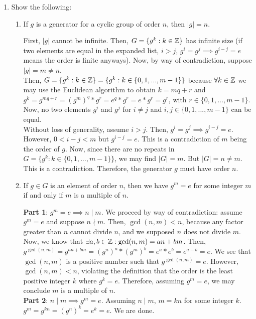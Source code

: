 \documentclass{amsart}
\begin{document}
\begin{enumerate}[itemsep=0.4in]
\item Show the following:
\begin{enumerate}
	\item If $g$ is a generator for a cyclic group of order $n$, then $|g| = n$.

        First, $|g|$ cannot be infinite. Then, $G=\{g^k:k\in\mathbb{Z}\}$ has infinite size (if two elements are equal in the expanded list, $i>j$, $g^i=g^j\implies g^{i-j}=e$ means the order is finite anyways). Now, by way of contradiction, suppose $|g|=m\neq n$.\\

        Then, $G=\{g^k:k\in\mathbb{Z}\}=\{g^k:k\in\{0,1,...,m-1\}\}$ because $\forall k\in\mathbb{Z}$ we may use the Euclidean algorithm to obtain $k=mq+r$ and $g^k=g^{mq+r}=(g^m)^q*g^r=e^q*g^r=e*g^r=g^r$, with $r\in\{0,1,...,m-1\}$. Now, no two elements $g^i$ and $g^j$ for $i\neq j$ and $i,j\in\{0,1,...,m-1\}$ can be equal.\\
        
        Without loss of generality, assume $i>j$. Then, $g^i=g^j\implies g^{i-j}=e$. However, $0<i-j<m$ but $g^{i-j}=e$. This is a contradiction of $m$ being the order of $g$. Now, since there are no repeats in $G=\{g^k:k\in\{0,1,...,m-1\}\}$, we may find $|G|=m$. But $|G|=n\neq m$. This is a contradiction. Therefore, the generator $g$ must have order $n$.
        
    
	\item If $g\in G$ is an element of order $n$, then we have $g^m = e$ for some integer $m$ if and only if $m$ is a multiple of $n$.
    
        \textbf{Part 1}: $g^m=e\implies n\mid m$. We proceed by way of contradiction: assume $g^m=e$ and suppose $n\nmid m$. Then, $\gcd(n,m)<n$, because any factor greater than $n$ cannot divide $n$, and we supposed $n$ does not divide $m$. Now, we know that $\exists a,b\in\mathbb{Z}:\gcd(n,m)=an+bm$. Then, $g^{\gcd(n,m)}=g^{an+bm}=(g^n)^a*(g^m)^b=e^a*e^b=e^{a+b}=e$. We see that $\gcd(n,m)$ is a positive number such that $g^{\gcd(n,m)}=e$. However, $\gcd(n,m)<n$, violating the definition that the order is the least positive integer $k$ where $g^k=e$. Therefore, assuming $g^m=e$, we may conclude $m$ is a multiple of $n$.\\

        \textbf{Part 2}: $n\mid m\implies g^m=e$. Assuming $n\mid m$, $m=kn$ for some integer $k$. $g^m=g^{kn}=(g^n)^k=e^k=e$. We are done.
    
\end{enumerate}


\end{enumerate}
\end{document}

